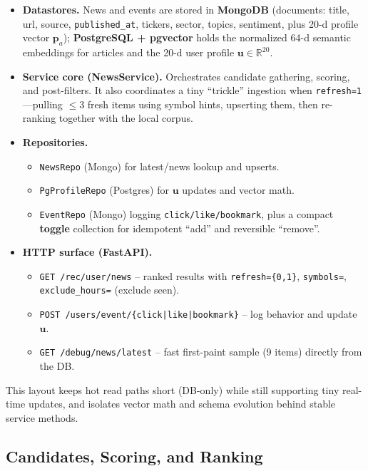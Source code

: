 \begin{itemize}
  \item \textbf{Datastores.} News and events are stored in \textbf{MongoDB} (documents: title, url, source, \texttt{published\_at}, tickers, sector, topics, sentiment, plus 20-d profile vector \(\mathbf{p}_a\)); \textbf{PostgreSQL + pgvector} holds the normalized 64-d semantic embeddings for articles and the 20-d user profile \(\mathbf{u}\in\mathbb{R}^{20}\).
  \item \textbf{Service core (NewsService).} Orchestrates candidate gathering, scoring, and post-filters. It also coordinates a tiny ``trickle'' ingestion when \texttt{refresh=1}---pulling \(\le 3\) fresh items using symbol hints, upserting them, then re-ranking together with the local corpus.
  \item \textbf{Repositories.}
    \begin{itemize}
        \item \texttt{NewsRepo} (Mongo) for latest/news lookup and upserts.
        \item \texttt{PgProfileRepo} (Postgres) for \(\mathbf{u}\) updates and vector math.
        \item \texttt{EventRepo} (Mongo) logging \texttt{click/like/bookmark}, plus a compact \textbf{toggle} collection for idempotent ``add'' and reversible ``remove''.
    \end{itemize}
  \item \textbf{HTTP surface (FastAPI).}
    \begin{itemize}
        \item \texttt{GET /rec/user/news} -- ranked results with \texttt{refresh=\{0,1\}}, \texttt{symbols=}, \texttt{exclude\_hours=} (exclude seen).
        \item \texttt{POST /users/event/\{click|like|bookmark\}} -- log behavior and update \(\mathbf{u}\).
        \item \texttt{GET /debug/news/latest} -- fast first-paint sample (9 items) directly from the DB.
    \end{itemize}
\end{itemize}

This layout keeps hot read paths short (DB-only) while still supporting tiny real-time updates, and isolates vector math and schema evolution behind stable service methods.

\subsection{Candidates, Scoring, and Ranking}

